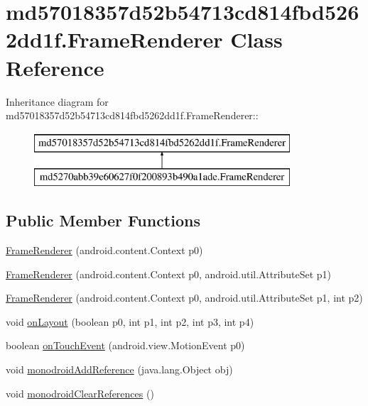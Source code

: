\hypertarget{classmd57018357d52b54713cd814fbd5262dd1f_1_1_frame_renderer}{
\section{md57018357d52b54713cd814fbd5262dd1f.FrameRenderer Class Reference}
\label{classmd57018357d52b54713cd814fbd5262dd1f_1_1_frame_renderer}
}
Inheritance diagram for md57018357d52b54713cd814fbd5262dd1f.FrameRenderer::\begin{figure}[H]
\begin{center}
\leavevmode
\includegraphics[height=2cm]{classmd57018357d52b54713cd814fbd5262dd1f_1_1_frame_renderer}
\end{center}
\end{figure}
\subsection*{Public Member Functions}
\begin{CompactItemize}
\item 
\hyperlink{classmd57018357d52b54713cd814fbd5262dd1f_1_1_frame_renderer_d9ccbd927d3475ddc5925f7a5ac54325}{FrameRenderer} (android.content.Context p0)
\item 
\hyperlink{classmd57018357d52b54713cd814fbd5262dd1f_1_1_frame_renderer_4d6af57c34847b40d0d23873adb2b744}{FrameRenderer} (android.content.Context p0, android.util.AttributeSet p1)
\item 
\hyperlink{classmd57018357d52b54713cd814fbd5262dd1f_1_1_frame_renderer_f14bbf276a028d7c7d94a1530288998c}{FrameRenderer} (android.content.Context p0, android.util.AttributeSet p1, int p2)
\item 
void \hyperlink{classmd57018357d52b54713cd814fbd5262dd1f_1_1_frame_renderer_af0948288e17edaaabea73769edf9c2a}{onLayout} (boolean p0, int p1, int p2, int p3, int p4)
\item 
boolean \hyperlink{classmd57018357d52b54713cd814fbd5262dd1f_1_1_frame_renderer_ea790f7f0f5e6f35f6ba260beeea4479}{onTouchEvent} (android.view.MotionEvent p0)
\item 
void \hyperlink{classmd57018357d52b54713cd814fbd5262dd1f_1_1_frame_renderer_14f0719110866c6f4a0475fbfc1ce2ad}{monodroidAddReference} (java.lang.Object obj)
\item 
void \hyperlink{classmd57018357d52b54713cd814fbd5262dd1f_1_1_frame_renderer_7c48666937065ca752fc6c9435980aaa}{monodroidClearReferences} ()
\end{CompactItemize}
